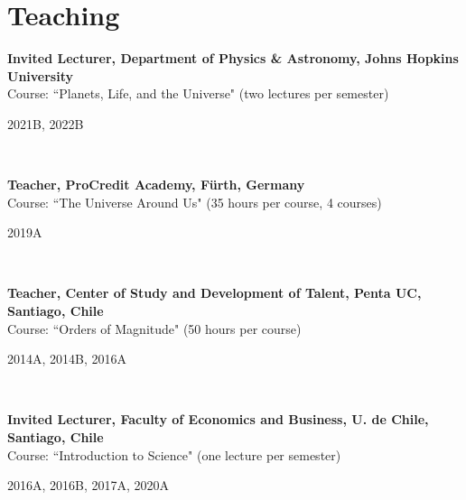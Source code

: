 \documentclass[12pt, a4paper]{article} %
\begin{document}
\section*{Teaching}

\begin{minipage}[t]{0.7\textwidth}
\begin{flushleft}%
  \setlength{\leftskip}{0.2cm}%
\textbf{Invited Lecturer, Department of Physics \& Astronomy, Johns Hopkins University}\\
Course: ``Planets, Life, and the Universe" (two lectures per semester)
\end{flushleft}
\end{minipage}
\begin{minipage}[t]{0.3\textwidth}
\hfill 2021B, 2022B
\end{minipage}\\

\begin{minipage}[t]{0.7\textwidth}
\begin{flushleft}%
  \setlength{\leftskip}{0.2cm}%
\textbf{Teacher, ProCredit Academy, F\"urth, Germany}\\
Course: ``The Universe Around Us" (35 hours per course, 4 courses)
\end{flushleft}
\end{minipage}
\begin{minipage}[t]{0.3\textwidth}
\hfill 2019A
\end{minipage}\\

\begin{minipage}[t]{0.7\textwidth}
\begin{flushleft}%
  \setlength{\leftskip}{0.2cm}%
\textbf{Teacher, Center of Study and Development of Talent, Penta UC, Santiago, Chile}\\
Course: ``Orders of Magnitude" (50 hours per course)
\end{flushleft}
\end{minipage}
\begin{minipage}[t]{0.3\textwidth}
\hfill 2014A, 2014B, 2016A
\end{minipage}\\

\begin{minipage}[t]{0.7\textwidth}
\begin{flushleft}%
  \setlength{\leftskip}{0.2cm}%
\textbf{Invited Lecturer, Faculty of Economics and Business, U. de Chile, Santiago, Chile}\\
Course: ``Introduction to Science" (one lecture per semester)
\end{flushleft}
\end{minipage}
\begin{minipage}[t]{0.3\textwidth}
\hfill 2016A, 2016B, 2017A, 2020A
\end{minipage}
\end{document}
